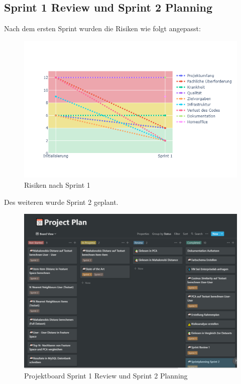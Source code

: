 \subsection*{Sprint 1 Review und Sprint 2 Planning}
Nach dem ersten Sprint wurden die Risiken wie folgt angepasst:
\begin{figure}[htb]
	\centering
	\includegraphics[keepaspectratio,width=\linewidth]{img/Risiken Sprint1.png}
	\caption{Risiken nach Sprint 1}
	\label{fig:Sprint 1 Risiken}
\end{figure}
Des weiteren wurde Sprint 2 geplant. 
\begin{figure}[htb]
	\centering
	\includegraphics[keepaspectratio,width=\linewidth]{img/Projektboard Review Sprint1 Planning Sprint2.png}
	\caption{Projektboard Sprint 1 Review und Sprint 2 Planning}
	\label{fig:Sprint 1 Review}
\end{figure}


